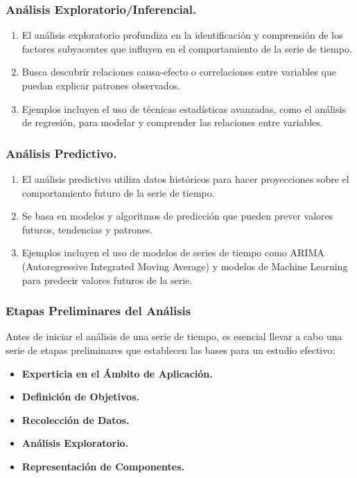 \documentclass{beamer}
\begin{document}
\begin{frame}
	\frametitle{Análisis Exploratorio/Inferencial.}
	\begin{enumerate}
		\item El análisis exploratorio profundiza en la identificación y comprensión de los factores subyacentes que influyen en el comportamiento de la serie de tiempo.
		\item Busca descubrir relaciones causa-efecto o correlaciones entre variables que puedan explicar patrones observados.
		\item Ejemplos incluyen el uso de técnicas estadísticas avanzadas, como el análisis de regresión, para modelar y comprender las relaciones entre variables.
	\end{enumerate}
\end{frame}

\begin{frame}
	\frametitle{Análisis Predictivo.}
	\begin{enumerate}
		\item El análisis predictivo utiliza datos históricos para hacer proyecciones sobre el comportamiento futuro de la serie de tiempo.
		\item Se basa en modelos y algoritmos de predicción que pueden prever valores futuros, tendencias y patrones.
		\item Ejemplos incluyen el uso de modelos de series de tiempo como ARIMA (Autoregressive Integrated Moving Average) y modelos de Machine Learning para predecir valores futuros de la serie.
	\end{enumerate}
\end{frame}

\begin{frame}
	\frametitle{Etapas Preliminares del Análisis}
	\begin{block}
		Antes de iniciar el análisis de una serie de tiempo, es esencial llevar a cabo una serie de etapas preliminares que establecen las bases para un estudio efectivo:
		\begin{itemize}
			\item \textbf{Experticia en el Ámbito de Aplicación.} 
			\item \textbf{Definición de Objetivos.}
			\item \textbf{Recolección de Datos.}
			\item \textbf{Análisis Exploratorio.} 
			\item \textbf{Representación de Componentes.}
		\end{itemize}
	\end{block}
  \end{frame}
  
\end{document}
